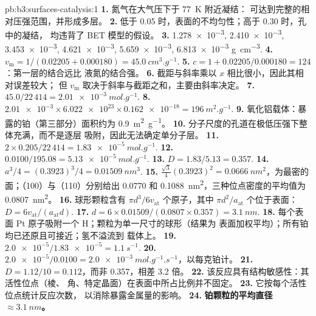 \begin{solution}{pb:b3:surfaces-catalysis:1}
\textbf{1.} 氮气在大气压下于 \qty{77}{K} 附近凝结：
可达到完整的相对压强范围，并形成多层。
\textbf{2.} 低于 0.05 时，表面的不均匀性；高于 0.30 时，孔中的凝结，
均违背了 BET 模型的假设。
\textbf{3.} \num{1.278e-3}, \num{2.410e-3}, \num{3.453e-3}, \num{4.621e-3}, \num{5.659e-3}, \num{6.813e-3} \unit{g.cm^{-3}}.
\textbf{4.} $v_{\mathrm m} = 1/(0.02205 + 0.000180) = \qty{45.0}{cm^3.g^{-1}}$.
\textbf{5.} $c = 1 + 0.02205/0.000180 = 124$：第一层的结合远比
液氮的结合强。
\textbf{6.} 截距与斜率乘以 $x$ 相比很小，因此其相对误差较大；
但 $v_{\mathrm m}$ 取决于斜率与截距之和，主要由斜率决定。
\textbf{7.} $45.0/22\,414 = \qty{2.01e-3}{mol.g^{-1}}$.
\textbf{8.} $\num{2.01e-3} \times \num{6.022e23} \times \num{0.162e-18} = \qty{196}{m^2.g^{-1}}$.
\textbf{9.} 氧化铝载体：暴露的铂（第三部分）面积约为 \qty{0.9}{m^2.g^{-1}}。
\textbf{10.} 分子尺度的孔道在极低压强下整体充满，而不是逐层
吸附，因此无法确定单分子层。
\textbf{11.} $2 \times 0.205/22\,414 = \qty{1.83e-5}{mol.g^{-1}}$.
\textbf{12.} $0.0100/195.08 = \qty{5.13e-5}{mol.g^{-1}}$.
\textbf{13.} $D = 1.83/5.13 = 0.357$.
\textbf{14.} $a^3/4 = (0.3923)^3/4 = \qty{0.01509}{nm^3}$.
\textbf{15.} $\frac{\sqrt3}{4}(0.3923)^2 = \qty{0.0666}{nm^2}$，为最密的面；（100）与（110）分别给出 0.0770 和
\qty{0.1088}{nm^2}，三种位点密度的平均值为 \qty{0.0807}{nm^2}。
\textbf{16.} 球形颗粒含有 $\pi d^3/6v_{\mathrm{at}}$ 个原子，其中 $\pi d^2/a_{\mathrm{at}}$ 个位于表面：
$D = 6v_{\mathrm{at}}/(a_{\mathrm{at}}d)$.
\textbf{17.} $d = 6 \times 0.01509/(0.0807 \times 0.357) = \qty{3.1}{nm}$.
\textbf{18.} 每个表面 Pt 原子吸附一个 H；颗粒为单一尺寸的球形（结果为
表面加权平均）；所有铂均已还原且可接近；氢不溢流到
载体上。
\textbf{19.} $\num{2.0e-5}/\num{1.83e-5} = \qty{1.1}{s^{-1}}$.
\textbf{20.} $\num{2.0e-5}/0.0100 = \qty{2.0e-3}{mol.g^{-1}.s^{-1}}$，以每克铂计。
\textbf{21.} $D = 1.12/10 = 0.112$，而非 0.357，相差 3.2 倍。
\textbf{22.} 该反应具有结构敏感性：其活性位点（棱、
角、特定晶面）在表面中所占比例并不固定。
\textbf{23.} 它按每个活性位点统计反应次数，
以消除暴露金属量的影响。
\textbf{24.} \textbf{铂颗粒的平均直径 $\approx \qty{3.1}{nm}$。}
\end{solution}
